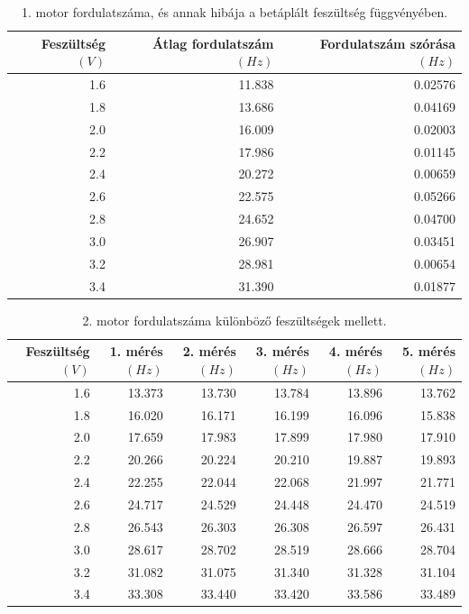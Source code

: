 \documentclass[10pt,pdftex]{report}
\begin{document}
\begin{table}[H]
    \begin{tabular}{|r|r|r|}
        \hline
        Feszültség$(V)$ & Átlag fordulatszám$(Hz)$ & Fordulatszám szórása$(Hz)$ \\
        \hline
        1.6 & 11.838 & 0.02576 \\
        \hline
        1.8 & 13.686 & 0.04169 \\
        \hline
        2.0 & 16.009 & 0.02003 \\
        \hline
        2.2 & 17.986 & 0.01145 \\
        \hline
        2.4 & 20.272 & 0.00659 \\
        \hline
        2.6 & 22.575 & 0.05266 \\
        \hline
        2.8 & 24.652 & 0.04700 \\
        \hline
        3.0 & 26.907 & 0.03451 \\
        \hline
        3.2 & 28.981 & 0.00654 \\
        \hline
        3.4 & 31.390 & 0.01877 \\
        \hline
    \end{tabular}
    \caption{1. motor fordulatszáma, és annak hibája a betáplált feszültség függvényében.}
\end{table}
\begin{table}[H]
    \begin{tabular}{|r|r|r|r|r|r|}
        \hline
        Feszültség$(V)$ & 1. mérés$(Hz)$ & 2. mérés$(Hz)$ & 3. mérés$(Hz)$ & 4. mérés$(Hz)$ & 5. mérés$(Hz)$ \\
        \hline
        1.6 & 13.373 & 13.730 & 13.784 & 13.896 & 13.762 \\
        \hline
        1.8 & 16.020 & 16.171 & 16.199 & 16.096 & 15.838 \\
        \hline
        2.0 & 17.659 & 17.983 & 17.899 & 17.980 & 17.910 \\
        \hline
        2.2 & 20.266 & 20.224 & 20.210 & 19.887 & 19.893 \\
        \hline
        2.4 & 22.255 & 22.044 & 22.068 & 21.997 & 21.771 \\
        \hline
        2.6 & 24.717 & 24.529 & 24.448 & 24.470 & 24.519 \\
        \hline
        2.8 & 26.543 & 26.303 & 26.308 & 26.597 & 26.431 \\
        \hline
        3.0 & 28.617 & 28.702 & 28.519 & 28.666 & 28.704 \\
        \hline
        3.2 & 31.082 & 31.075 & 31.340 & 31.328 & 31.104 \\
        \hline
        3.4 & 33.308 & 33.440 & 33.420 & 33.586 & 33.489 \\
        \hline
    \end{tabular}
    \caption{2. motor fordulatszáma különböző feszültségek mellett.}
\end{table}
\end{document}
